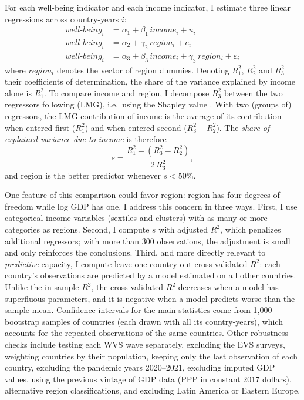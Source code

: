 \documentclass[12pt]{article}
\begin{document}
For each well-being indicator and each income indicator, I estimate three linear regressions across country-years $i$:
\begin{align}
    well\text{-}being_i &= \alpha_1 + \beta_1\, income_i + u_i \label{eq:income}\\
    well\text{-}being_i &= \alpha_2 + \gamma_2\, region_i + e_i \label{eq:region}\\
    well\text{-}being_i &= \alpha_3 + \beta_3\, income_i + \gamma_3\, region_i + \varepsilon_i \label{eq:both}
\end{align}
where $region_i$ denotes the vector of region dummies. Denoting $R^2_1$, $R^2_2$ and $R^2_3$ their coefficients of determination, the share of the variance explained by income alone is $R^2_1$. To compare income and region, I decompose $R^2_3$ between the two regressors following \citet{lindeman_introduction_1980} (LMG), i.e.\ using the Shapley value \citep{gromping_estimators_2007}. With two (groups of) regressors, the LMG contribution of income is the average of its contribution when entered first ($R^2_1$) and when entered second ($R^2_3 - R^2_2$). The \textit{share of explained variance due to income} is therefore
\begin{equation}
    s = \frac{R^2_1 + (R^2_3 - R^2_2)}{2\, R^2_3}, \label{eq:share}
\end{equation}
and region is the better predictor whenever $s < 50\%$.

One feature of this comparison could favor region: region has four degrees of freedom while log GDP has one. I address this concern in three ways. First, I use categorical income variables (sextiles and clusters) with as many or more categories as regions. Second, I compute $s$ with adjusted $R^2$, which penalizes additional regressors; with more than 300 observations, the adjustment is small and only reinforces the conclusions. Third, and more directly relevant to \textit{predictive} capacity, I compute leave-one-country-out cross-validated $R^2$: each country's observations are predicted by a model estimated on all other countries. Unlike the in-sample $R^2$, the cross-validated $R^2$ decreases when a model has superfluous parameters, and it is negative when a model predicts worse than the sample mean. Confidence intervals for the main statistics come from 1,000 bootstrap samples of countries (each drawn with all its country-years), which accounts for the repeated observations of the same countries. Other robustness checks include testing each WVS wave separately, excluding the EVS surveys, weighting countries by their population, keeping only the last observation of each country, excluding the pandemic years 2020--2021, excluding imputed GDP values, using the previous vintage of GDP data (PPP in constant 2017 dollars), alternative region classifications, and excluding Latin America or Eastern Europe.
\end{document}
